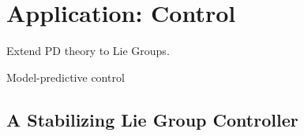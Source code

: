 
\chapter{Application: Control}

\begin{itemize_outcomes}
  \item Extend PD theory to Lie Groups.
  \item Model-predictive control
\end{itemize_outcomes}

\section{A Stabilizing Lie Group Controller}

